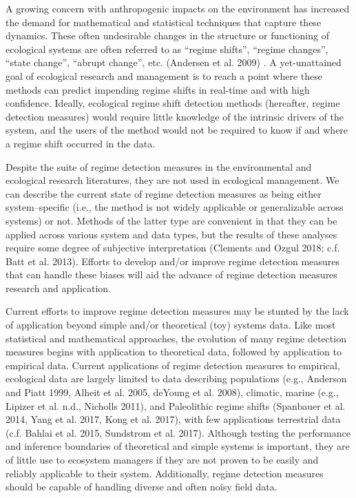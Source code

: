 \documentclass[12pt,twoside,openany]{reedthesis}
\begin{document}
A growing concern with anthropogenic impacts on the environment has
increased the demand for mathematical and statistical techniques that
capture these dynamics. These often undesirable changes in the structure
or functioning of ecological systems are often referred to as ``regime
shifts'', ``regime changes'', ``state change'', ``abrupt change'', etc.
(Andersen et al. 2009) . A yet-unattained goal of ecological research
and management is to reach a point where these methods can predict
impending regime shifts in real-time and with high confidence. Ideally,
ecological regime shift detection methods (hereafter, regime detection
measures) would require little knowledge of the intrinsic drivers of the
system, and the users of the method would not be required to know if and
where a regime shift occurred in the data.

Despite the suite of regime detection measures in the environmental and
ecological research literatures, they are not used in ecological
management. We can describe the current state of regime detection
measures as being either system--specific (i.e., the method is not
widely applicable or generalizable across systems) or not. Methods of
the latter type are convenient in that they can be applied across
various system and data types, but the results of these analyses require
some degree of subjective interpretation (Clements and Ozgul 2018; c.f.
Batt et al. 2013). Efforts to develop and/or improve regime detection
measures that can handle these biases will aid the advance of regime
detection measures research and application.

Current efforts to improve regime detection measures may be stunted by
the lack of application beyond simple and/or theoretical (toy) systems
data. Like most statistical and mathematical approaches, the evolution
of many regime detection measures begins with application to theoretical
data, followed by application to empirical data. Current applications of
regime detection measures to empirical, ecological data are largely
limited to data describing populations (e.g., Anderson and Piatt 1999,
Alheit et al. 2005, deYoung et al. 2008), climatic, marine (e.g.,
Lipizer et al. n.d., Nicholls 2011), and Paleolithic regime shifts
(Spanbauer et al. 2014, Yang et al. 2017, Kong et al. 2017), with few
applications terrestrial data (c.f. Bahlai et al. 2015, Sundstrom et al.
2017). Although testing the performance and inference boundaries of
theoretical and simple systems is important, they are of little use to
ecosystem managers if they are not proven to be easily and reliably
applicable to their system. Additionally, regime detection measures
should be capable of handling diverse and often noisy field data.
\end{document}
